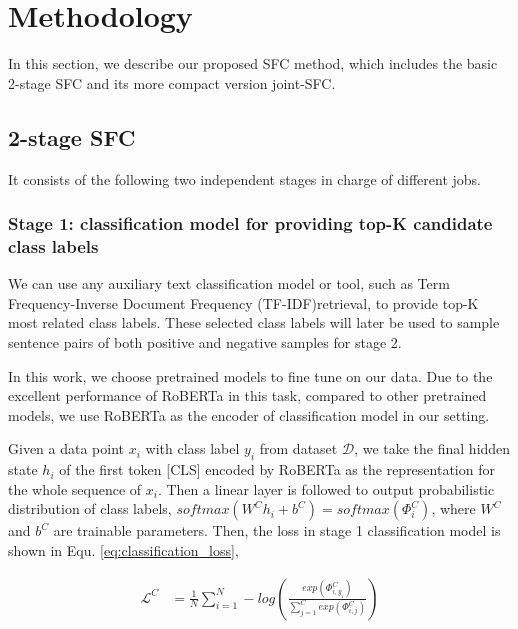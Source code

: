 \section{Methodology}
In  this section, we describe our proposed SFC method, which includes the basic 2-stage SFC and its more compact version joint-SFC.

\subsection{2-stage SFC}

It consists of the following  two  independent stages  in  charge of different  jobs. 

\subsubsection*{
  Stage 1: classification model for providing top-K candidate class labels
} 
We  can  use any auxiliary text classification model or tool,
such as Term Frequency-Inverse Document Frequency (TF-IDF)retrieval, to
provide  top-K  most  related  class  labels. These selected class labels will
later  be  used to sample sentence pairs of both positive and negative
samples  for  stage  2. 

In  this  work,  we  choose pretrained models to fine tune on our data.
Due to the excellent performance of RoBERTa in this task, compared to other pretrained
models, we use RoBERTa as the encoder of classification model in our setting.

Given   a   data   point   $x_{i}$  with  class  label  $y_{i}$  from  dataset
$\mathcal{D}$, we take the final hidden state $h_{i}$ of the first token [CLS]
encoded  by  RoBERTa  as the representation for the whole sequence of $x_{i}$.
Then  a linear layer is followed to output probabilistic distribution of class
labels,  $softmax(W^Ch_{i}+b^C)=softmax({\Phi}^C_{i})$,  where $W^C$ and $b^C$
are  trainable  parameters.  Then, the loss in stage 1 classification model is
shown in Equ. \ref{eq:classification_loss},

\vspace{-2em}
\begin{equation}
  \begin{aligned}
    \mathcal{L}^{C}&=\frac{1}{N}\sum_{i=1}^{N}-log(\frac{exp(\varPhi_{i,y_{i}}^C)}{\sum_{j=1}^{C}exp(\varPhi_{i,j}^C)}) \\
    \label{eq:classification_loss}
  \end{aligned}
\end{equation}
\vspace{-2.5em}

